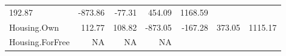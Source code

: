 \documentclass[]{article}
\begin{document}
\begin{longtable}[]{@{}lrrrrrr@{}}
\begin{minipage}[t]{0.08\columnwidth}
192.87\strut
\end{minipage} & \begin{minipage}[t]{0.08\columnwidth}\raggedleft\strut
-873.86\strut
\end{minipage} & \begin{minipage}[t]{0.08\columnwidth}\raggedleft\strut
-77.31\strut
\end{minipage} & \begin{minipage}[t]{0.08\columnwidth}\raggedleft\strut
454.09\strut
\end{minipage} & \begin{minipage}[t]{0.08\columnwidth}\raggedleft\strut
1168.59\strut
\end{minipage}\tabularnewline
\begin{minipage}[t]{0.31\columnwidth}\raggedright\strut
Housing.Own\strut
\end{minipage} & \begin{minipage}[t]{0.10\columnwidth}\raggedleft\strut
112.77\strut
\end{minipage} & \begin{minipage}[t]{0.08\columnwidth}\raggedleft\strut
108.82\strut
\end{minipage} & \begin{minipage}[t]{0.08\columnwidth}\raggedleft\strut
-873.05\strut
\end{minipage} & \begin{minipage}[t]{0.08\columnwidth}\raggedleft\strut
-167.28\strut
\end{minipage} & \begin{minipage}[t]{0.08\columnwidth}\raggedleft\strut
373.05\strut
\end{minipage} & \begin{minipage}[t]{0.08\columnwidth}\raggedleft\strut
1115.17\strut
\end{minipage}\tabularnewline
\begin{minipage}[t]{0.31\columnwidth}\raggedright\strut
Housing.ForFree\strut
\end{minipage} & \begin{minipage}[t]{0.10\columnwidth}\raggedleft\strut
NA\strut
\end{minipage} & \begin{minipage}[t]{0.08\columnwidth}\raggedleft\strut
NA\strut
\end{minipage} & \begin{minipage}[t]{0.08\columnwidth}\raggedleft\strut
NA\strut
\end{minipage} & \begin{minipage}[t]{0.08\columnwidth}\raggedleft\strut

\end{minipage}
\end{longtable}
\end{document}
